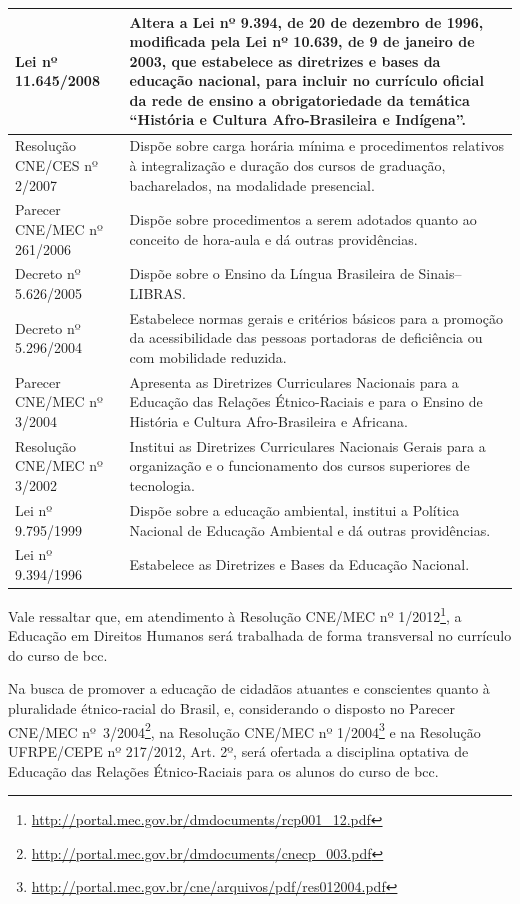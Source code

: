 \documentclass[
	12pt,				%
	openright,			%
  oneside,     %
	a4paper,			%
 hyphens,
	chapter=TITLE,		%
	english,			%
	french,				%
	spanish,			%
	brazil				%
	]{abntex2}
\begin{document}
\begin{center}
\begin{scriptsize}
\begin{longtable}{p{5.8cm}p{9cm}}
    Lei nº 11.645/2008	& Altera a Lei nº 9.394, de 20 de dezembro de 1996, modificada pela Lei nº 10.639, de 9 de janeiro de 2003, que estabelece as diretrizes e bases da educação nacional, para incluir no currículo oficial da rede de ensino a obrigatoriedade da temática ``História e Cultura Afro-Brasileira e Indígena''. \\ \midrule
    Resolução CNE/CES nº 2/2007 & Dispõe sobre carga horária mínima e procedimentos relativos à integralização e duração dos cursos de graduação, bacharelados, na modalidade presencial. \\ \midrule
    Parecer CNE/MEC nº 261/2006	& Dispõe sobre procedimentos a serem adotados quanto ao conceito de hora-aula e dá outras providências. \\ \midrule
    Decreto nº 5.626/2005 & Dispõe sobre o Ensino da Língua Brasileira de Sinais--LIBRAS. \\ \midrule
    Decreto nº 5.296/2004 & Estabelece normas gerais e critérios básicos para a promoção da 	acessibilidade das pessoas portadoras de deficiência ou com mobilidade reduzida. \\ \midrule
    Parecer CNE/MEC nº 3/2004 & Apresenta as Diretrizes Curriculares Nacionais para a Educação das	Relações Étnico-Raciais e para o Ensino de História e Cultura Afro-Brasileira e Africana. \\ \midrule
    Resolução CNE/MEC nº 3/2002 & Institui	as Diretrizes Curriculares Nacionais Gerais para a organização e o funcionamento dos cursos superiores de tecnologia. \\ \midrule
    Lei nº 9.795/1999 & Dispõe sobre a educação ambiental, institui a Política Nacional de Educação Ambiental e dá outras providências. \\ \midrule
    Lei nº 9.394/1996 & Estabelece as Diretrizes e Bases da Educação Nacional.\\ 
    \bottomrule
    \end{longtable}
\end{scriptsize}      
\end{center}


Vale ressaltar que, em atendimento à Resolução CNE/MEC nº 1/2012\footnote{\url{http://portal.mec.gov.br/dmdocuments/rcp001_12.pdf}}, a Educação em Direitos Humanos será trabalhada de forma transversal no currículo do curso de \acrlong{bcc}.

Na busca de promover a educação de cidadãos atuantes e conscientes quanto à pluralidade étnico-racial do Brasil, e, considerando o disposto no Parecer CNE/MEC nº~3/2004\footnote{\url{http://portal.mec.gov.br/dmdocuments/cnecp_003.pdf}}, na Resolução CNE/MEC nº 1/2004\footnote{\url{http://portal.mec.gov.br/cne/arquivos/pdf/res012004.pdf}} e na Resolução UFRPE/CEPE nº 217/2012, Art. 2º, será ofertada a disciplina optativa de Educação das Relações Étnico-Raciais para os alunos do curso de \acrlong{bcc}.
\end{document}

